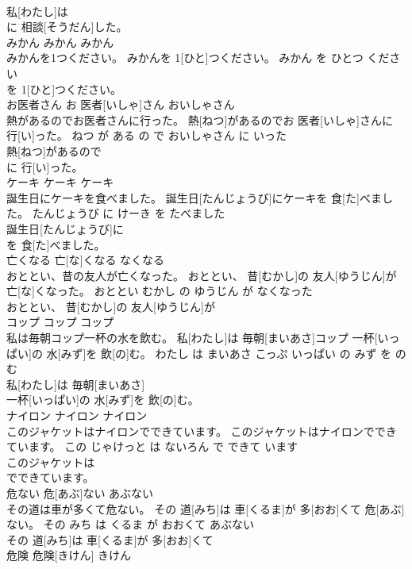 \documentclass[8pt]{extreport}
\begin{document}
\begin{CJK}{UTF8}{min}
\\	私[わたし]は
\\	に 相談[そうだん]した。			
\\	みかん	みかん	みかん	
\\	みかんを1つください。	みかんを 1[ひと]つください。	みかん を ひとつ ください	
\\	を 1[ひと]つください。			
\\	お医者さん	お 医者[いしゃ]さん	おいしゃさん	
\\	熱があるのでお医者さんに行った。	熱[ねつ]があるのでお 医者[いしゃ]さんに 行[い]った。	ねつ が ある の で おいしゃさん に いった	
\\	熱[ねつ]があるので
\\	に 行[い]った。			
\\	ケーキ	ケーキ	ケーキ	
\\	誕生日にケーキを食べました。	誕生日[たんじょうび]にケーキを 食[た]べました。	たんじょうび に けーき を たべました	
\\	誕生日[たんじょうび]に
\\	を 食[た]べました。			
\\	亡くなる	亡[な]くなる	なくなる	
\\	おととい、昔の友人が亡くなった。	おととい、 昔[むかし]の 友人[ゆうじん]が 亡[な]くなった。	おととい むかし の ゆうじん が なくなった	
\\	おととい、 昔[むかし]の 友人[ゆうじん]が
\\	コップ	コップ	コップ	
\\	私は毎朝コップ一杯の水を飲む。	私[わたし]は 毎朝[まいあさ]コップ 一杯[いっぱい]の 水[みず]を 飲[の]む。	わたし は まいあさ こっぷ いっぱい の みず を のむ	
\\	私[わたし]は 毎朝[まいあさ]
\\	一杯[いっぱい]の 水[みず]を 飲[の]む。			
\\	ナイロン	ナイロン	ナイロン	
\\	このジャケットはナイロンでできています。	このジャケットはナイロンでできています。	この じゃけっと は ないろん で できて います	
\\	このジャケットは
\\	でできています。			
\\	危ない	危[あぶ]ない	あぶない	
\\	その道は車が多くて危ない。	その 道[みち]は 車[くるま]が 多[おお]くて 危[あぶ]ない。	その みち は くるま が おおくて あぶない	
\\	その 道[みち]は 車[くるま]が 多[おお]くて
\\	危険	危険[きけん]	きけん	

\end{CJK}
\end{document}
